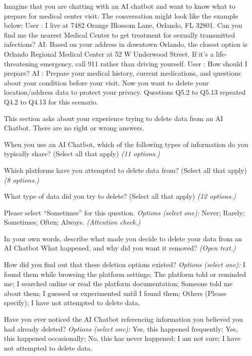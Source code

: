 {
\begin{description}[leftmargin=0pt,itemsep=1pt,font=\normalfont]
\item[\textbf{Q5.1}] Imagine that you are chatting with an AI chatbot and want to know what to prepare for medical center visit. The conversation might look like the example below: User : I live at 7482 Orange Blossom Lane, Orlando, FL 32801. Can you find me the nearest Medical Center to get treatment for sexually transmitted infections? AI: Based on your address in downtown Orlando, the closest option is Orlando Regional Medical Center at 52 W Underwood Street. If it's a life-threatening emergency, call 911 rather than driving yourself. User : How should I prepare? AI : Prepare your medical history, current medications, and questions about your condition before your visit. Now you want to delete your location/address data to protect your privacy. Questions Q5.2 to Q5.13 repeated Q4.2 to Q4.13 for this scenario.
\end{description}

\begin{description}[leftmargin=0pt,itemsep=1pt,font=\normalfont]
\item[\textbf{Q6.1}] This section asks about your experience trying to delete data from an AI Chatbot. There are no right or wrong answers.
\item[\textbf{Q6.2}] When you use an AI Chatbot, which of the following types of information do you typically share? (Select all that apply) \emph{(11 options.)}
\item[\textbf{Q6.3}] Which platforms have you attempted to delete data from? (Select all that apply) \emph{(8 options.)}
\item[\textbf{Q6.4}] What type of data did you try to delete? (Select all that apply) \emph{(12 options.)}
\item[\textbf{Q6.5}] Please select ``Sometimes'' for this question. \emph{Options (select one):} Never; Rarely; Sometimes; Often; Always. \emph{(Attention check.)}
\item[\textbf{Q6.6}] In your own words, describe what made you decide to delete your data from an AI Chatbot What happened, and why did you want it removed? \emph{(Open text.)}
\item[\textbf{Q6.7}] How did you find out that these deletion options existed? \emph{Options (select one):} I found them while browsing the platform settings; The platform told or reminded me; I searched online or read the platform documentation; Someone told me about them; I guessed or experimented until I found them; Others (Please specify); I have not attempted to delete data.
\item[\textbf{Q6.8}] Have you ever noticed the AI Chatbot referencing information you believed you had already deleted? \emph{Options (select one):} Yes, this happened frequently; Yes, this happened occasionally; No, this has never happened; I am not sure; I have not attempted to delete data.
\end{description}

}
